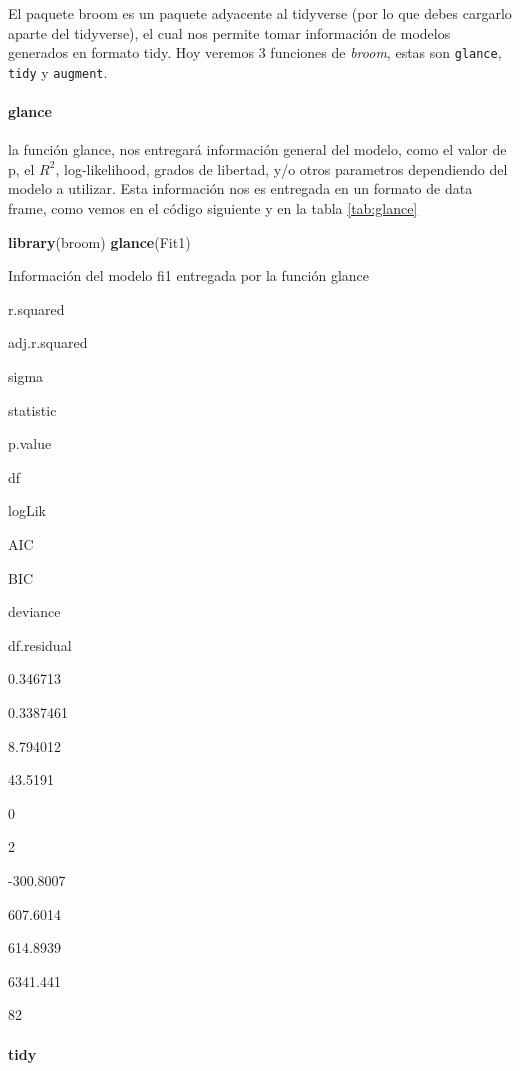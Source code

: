 \documentclass[]{book}
\newenvironment{Shaded}{\begin{snugshade}}{\end{snugshade}}
\newcommand{\KeywordTok}[1]{\textcolor[rgb]{0.13,0.29,0.53}{\textbf{#1}}}
\newcommand{\NormalTok}[1]{#1}
\let\oldparagraph\paragraph
\renewcommand{\paragraph}[1]{\oldparagraph{#1}\mbox{}}
\begin{document}
El paquete broom \citep{Robinson2018} es un paquete adyacente al
tidyverse (por lo que debes cargarlo aparte del tidyverse), el cual nos
permite tomar información de modelos generados en formato tidy. Hoy
veremos 3 funciones de \emph{broom}, estas son \texttt{glance},
\texttt{tidy} y \texttt{augment}.

\hypertarget{glance}{%
\paragraph{glance}\label{glance}}

la función glance, nos entregará información general del modelo, como el
valor de p, el \(R^2\), log-likelihood, grados de libertad, y/o otros
parametros dependiendo del modelo a utilizar. Esta información nos es
entregada en un formato de data frame, como vemos en el código siguiente
y en la tabla \ref{tab:glance}

\begin{Shaded}
\begin{Highlighting}[]
\KeywordTok{library}\NormalTok{(broom)}
\KeywordTok{glance}\NormalTok{(Fit1)}
\end{Highlighting}
\end{Shaded}

\label{tab:glance}Información del modelo fi1 entregada por la función glance

r.squared

adj.r.squared

sigma

statistic

p.value

df

logLik

AIC

BIC

deviance

df.residual

0.346713

0.3387461

8.794012

43.5191

0

2

-300.8007

607.6014

614.8939

6341.441

82

\hypertarget{tidy}{%
\paragraph{tidy}\label{tidy}}
\end{document}
